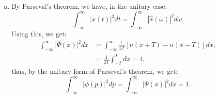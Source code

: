 \begin{enumerate}
\begin{enumerate}[a)]
\item By Parseval's theorem, we have, in the unitary case:
$$\int_{-\infty}^{\infty} |x(t)|^{2}dt=\int_{-\infty}^{\infty} |\hat{x}(\omega)|^{2}d\omega.$$
Using this, we get:
\begin{align*}
    \int_{-\infty}^{\infty}|\Psi(x)|^{2}dx&=\int_{-\infty}^{\infty}\frac{1}{2T}[u(x+T) - u(x-T)]dx, \\
            &= \frac{1}{2T}\int_{-T}^{T}dx=1,
\end{align*}
thus, by the unitary form of Parseval's theorem, we get:
$$\int_{-\infty}^{\infty}|\phi(p)|^{2}dp=\int_{-\infty}^{\infty}|\Psi(x)|^{2}dx=1.$$

\end{enumerate}



\end{enumerate}